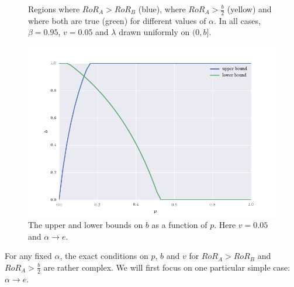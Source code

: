 \begin{figure}[t!]
\caption{{Regions where $RoR_A > RoR_B$ (blue), where $RoR_A > \frac{b}{2}$ (yellow) and where both are true (green) for different values of $\alpha$. In all cases, $\beta = 0.95$, $v = 0.05$ and $\lambda$ drawn uniformly on $(0,b]$.}}
\label{fig:offer_reward_or_not}
\end{figure}

\begin{figure}[t]
\centering
\includegraphics[scale = 0.4]{./figures/b_region_v2.png}
\caption{The upper and lower bounds on $b$ as a function of $p$. Here $v = 0.05$ and $\alpha \rightarrow e$.}
\label{fig:b_region}
\end{figure}

For any fixed $\alpha$, the exact conditions on $p$, $b$ and $v$ for $RoR_A > RoR_B$ and $RoR_A > \frac{b}{2}$ are rather complex. We will first focus on one particular simple case: $\alpha \rightarrow e$. 

